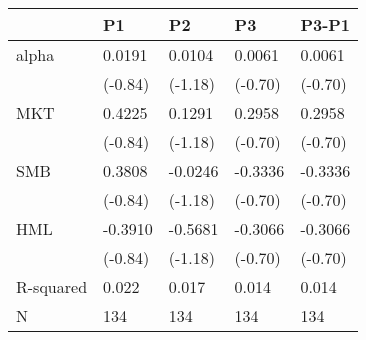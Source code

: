 \begin{tabular}{lllll}
\toprule
 & P1 & P2 & P3 & P3-P1 \\
\midrule
alpha & 0.0191 & 0.0104 & 0.0061 & 0.0061 \\
  & (-0.84) & (-1.18) & (-0.70) & (-0.70) \\
MKT & 0.4225 & 0.1291 & 0.2958 & 0.2958 \\
  & (-0.84) & (-1.18) & (-0.70) & (-0.70) \\
SMB & 0.3808 & -0.0246 & -0.3336 & -0.3336 \\
  & (-0.84) & (-1.18) & (-0.70) & (-0.70) \\
HML & -0.3910 & -0.5681 & -0.3066 & -0.3066 \\
  & (-0.84) & (-1.18) & (-0.70) & (-0.70) \\
R-squared & 0.022 & 0.017 & 0.014 & 0.014 \\
N & 134 & 134 & 134 & 134 \\
\bottomrule
\end{tabular}

